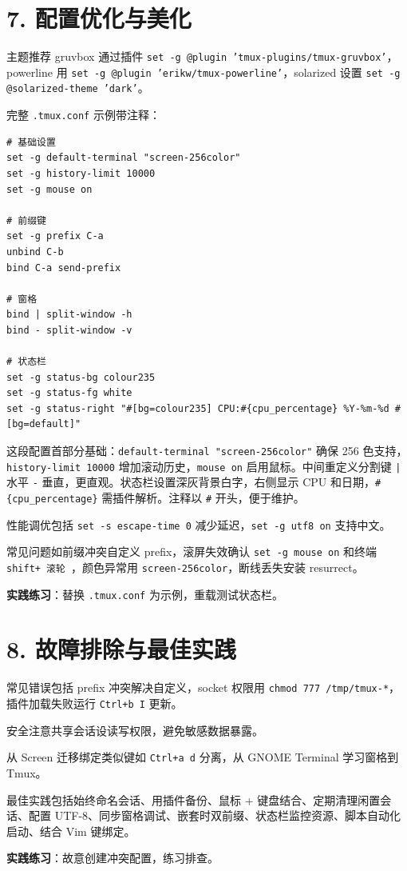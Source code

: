 \chapter{7. 配置优化与美化}
主题推荐 gruvbox 通过插件 \texttt{set -g @plugin 'tmux-plugins/tmux-gruvbox'}，powerline 用 \texttt{set -g @plugin 'erikw/tmux-powerline'}，solarized 设置 \texttt{set -g @solarized-theme 'dark'}。\par
完整 \texttt{.tmux.conf} 示例带注释：\par
\begin{lstlisting}
# 基础设置
set -g default-terminal "screen-256color"
set -g history-limit 10000
set -g mouse on

# 前缀键
set -g prefix C-a
unbind C-b
bind C-a send-prefix

# 窗格
bind | split-window -h
bind - split-window -v

# 状态栏
set -g status-bg colour235
set -g status-fg white
set -g status-right "#[bg=colour235] CPU:#{cpu_percentage} %Y-%m-%d #[bg=default]"
\end{lstlisting}
这段配置首部分基础：\texttt{default-terminal "screen-256color"} 确保 256 色支持，\texttt{history-limit 10000} 增加滚动历史，\texttt{mouse on} 启用鼠标。中间重定义分割键 \texttt{|} 水平 \texttt{-} 垂直，更直观。状态栏设置深灰背景白字，右侧显示 CPU 和日期，\texttt{\#{}\{{}cpu\_{}percentage\}{}} 需插件解析。注释以 \texttt{\#{}} 开头，便于维护。\par
性能调优包括 \texttt{set -s escape-time 0} 减少延迟，\texttt{set -g utf8 on} 支持中文。\par
常见问题如前缀冲突自定义 prefix，滚屏失效确认 \texttt{set -g mouse on} 和终端 \texttt{shift+ 滚轮 }，颜色异常用 \texttt{screen-256color}，断线丢失安装 resurrect。\par
\textbf{实践练习}：替换 \texttt{.tmux.conf} 为示例，重载测试状态栏。\par
\chapter{8. 故障排除与最佳实践}
常见错误包括 prefix 冲突解决自定义，socket 权限用 \texttt{chmod 777 /tmp/tmux-*}，插件加载失败运行 \texttt{Ctrl+b I} 更新。\par
安全注意共享会话设读写权限，避免敏感数据暴露。\par
从 Screen 迁移绑定类似键如 \texttt{Ctrl+a d} 分离，从 GNOME Terminal 学习窗格到 Tmux。\par
最佳实践包括始终命名会话、用插件备份、鼠标 + 键盘结合、定期清理闲置会话、配置 UTF-8、同步窗格调试、嵌套时双前缀、状态栏监控资源、脚本自动化启动、结合 Vim 键绑定。\par
\textbf{实践练习}：故意创建冲突配置，练习排查。\par
